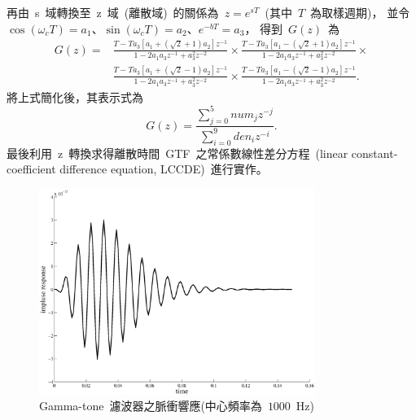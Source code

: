再由~s~域轉換至~z~域~(離散域)~的關係為~$z=e^{sT}$~(其中~$T$~為取樣週期)，
並令~$ \cos \left( \omega_c T \right) = a_1 $、$ \sin \left( \omega_c T \right) = a_2 $、$ e^{-bT} = a_3 $，
得到~$G(z)$~為
\begin{equation}
\label{eq:gz}
	 \begin{aligned}
		G(z) =  &\frac{ T - T a_3 \left[ a_1 + \left( \sqrt{2} + 1 \right) a_2 \right] z^{-1}}{1 - 2 a_1 a_3 z^{-1} + a_3^2 z^{-2}} \times  
			    \frac{ T - T a_3 \left[ a_1 - \left( \sqrt{2} + 1 \right) a_2 \right] z^{-1}}{1 - 2 a_1 a_3 z^{-1} + a_3^2 z^{-2}} \times \\
			    &\frac{ T - T a_3 \left[ a_1 + \left( \sqrt{2} - 1 \right) a_2 \right] z^{-1}}{1 - 2 a_1 a_3 z^{-1} + a_3^2 z^{-2}} \times 
			    \frac{ T - T a_3 \left[ a_1 - \left( \sqrt{2} - 1 \right) a_2 \right] z^{-1}}{1 - 2 a_1 a_3 z^{-1} + a_3^2 z^{-2}}.				
	 \end{aligned}  
\end{equation}
將上式簡化後，其表示式為
\begin{equation} 
\label{eq:ztrans}
	G(z) = \frac{ \sum_{j=0}^{5} num_j z^{-j} }{ \sum_{i=0}^{9} den_i z^{-i} }.
\end{equation}
最後利用~z~轉換求得離散時間~GTF~之常係數線性差分方程~(linear constant-coefficient difference equation, LCCDE)~進行實作。

\begin{figure}[!htb]
\centering
\includegraphics[width=0.8\textwidth]{figs/gtimr}
\caption{Gamma-tone~濾波器之脈衝響應(中心頻率為~$1000$~Hz)} 
\label{fig:gtimr}
\end{figure}

